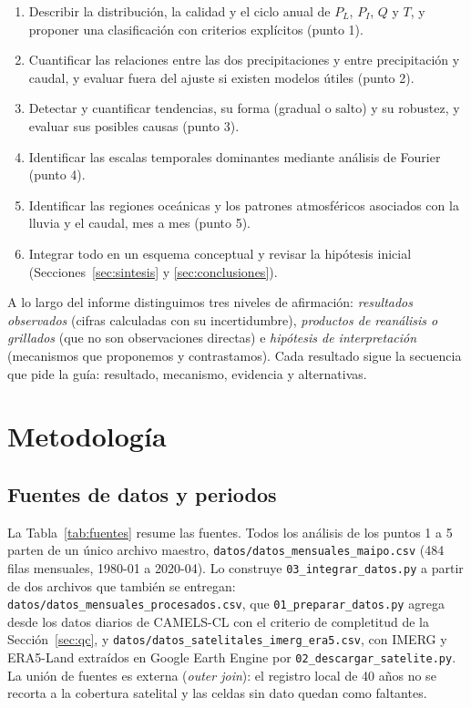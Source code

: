 \documentclass[11pt,a4paper]{article}
\newcommand{\archivo}[1]{\nolinkurl{#1}}
\newcommand{\PL}{P_L}
\newcommand{\PI}{P_I}
\newcommand{\Qm}{Q}
\begin{document}
\begin{enumerate}
\item Describir la distribución, la calidad y el ciclo anual de $\PL$, $\PI$, $\Qm$ y $T$, y proponer una clasificación con criterios explícitos (punto 1).
\item Cuantificar las relaciones entre las dos precipitaciones y entre precipitación y caudal, y evaluar fuera del ajuste si existen modelos útiles (punto 2).
\item Detectar y cuantificar tendencias, su forma (gradual o salto) y su robustez, y evaluar sus posibles causas (punto 3).
\item Identificar las escalas temporales dominantes mediante análisis de Fourier (punto 4).
\item Identificar las regiones oceánicas y los patrones atmosféricos asociados con la lluvia y el caudal, mes a mes (punto 5).
\item Integrar todo en un esquema conceptual y revisar la hipótesis inicial (Secciones~\ref{sec:sintesis} y \ref{sec:conclusiones}).
\end{enumerate}

A lo largo del informe distinguimos tres niveles de afirmación: \emph{resultados observados} (cifras calculadas con su incertidumbre), \emph{productos de reanálisis o grillados} (que no son observaciones directas) e \emph{hipótesis de interpretación} (mecanismos que proponemos y contrastamos). Cada resultado sigue la secuencia que pide la guía: resultado, mecanismo, evidencia y alternativas.
\section{Metodología}
\label{sec:metodologia}

\subsection{Fuentes de datos y periodos}
\label{sec:datos}

La Tabla~\ref{tab:fuentes} resume las fuentes. Todos los análisis de los puntos 1 a 5 parten de un único archivo maestro, \archivo{datos/datos_mensuales_maipo.csv} (484 filas mensuales, 1980-01 a 2020-04). Lo construye \archivo{03_integrar_datos.py} a partir de dos archivos que también se entregan: \archivo{datos/datos_mensuales_procesados.csv}, que \archivo{01_preparar_datos.py} agrega desde los datos diarios de CAMELS-CL con el criterio de completitud de la Sección~\ref{sec:qc}, y \archivo{datos/datos_satelitales_imerg_era5.csv}, con IMERG y ERA5-Land extraídos en Google Earth Engine por \archivo{02_descargar_satelite.py}. La unión de fuentes es externa (\emph{outer join}): el registro local de 40 años no se recorta a la cobertura satelital y las celdas sin dato quedan como faltantes.
\end{document}

